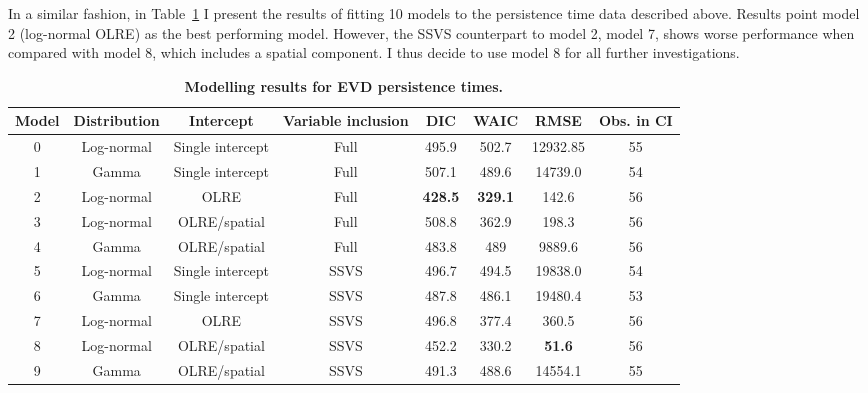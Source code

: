 In a similar fashion, in Table~\ref{tab:persistenceModels} I present the results of fitting 10 models to the persistence time data described above.
Results point model 2 (log-normal OLRE) as the best performing model.
However, the SSVS counterpart to model 2, model 7, shows worse performance when compared with model 8, which includes a spatial component.
I thus decide to use model 8 for all further investigations.

\begin{minipage}{\textwidth}    
\setcounter{mpfootnote}{\value{footnote}}
\renewcommand{\thempfootnote}{\arabic{mpfootnote}}
\fontsize{9}{10}\selectfont
{}
\begin{longtable}{cccccccc}
\caption{\textbf{Modelling results for EVD persistence times.}}
\label{tab:persistenceModels}\\
\toprule
Model & Distribution & Intercept& Variable inclusion & DIC  & WAIC   & RMSE\footnotemark[1] & Obs. in CI\footnotemark[2]\\
\toprule
0  & Log-normal & Single intercept & Full & 495.9 & 502.7 & 12932.85 & 55 \\
\hline
1   & Gamma & Single intercept & Full &  507.1 & 489.6 & 14739.0 & 54 \\
\hline
2 & Log-normal & OLRE & Full &  \textbf{428.5} & \textbf{329.1} & 142.6   & 56 \\
\hline
3 & Log-normal & OLRE/spatial\footnotemark[3] & Full & 508.8 & 362.9 & 198.3   & 56 \\
\hline
4 & Gamma & OLRE/spatial\footnotemark[4] & Full & 483.8 & 489 & 9889.6  & 56 \\
\hline
5 & Log-normal  & Single intercept & SSVS & 496.7 & 494.5 & 19838.0 & 54 \\
\hline
6 & Gamma & Single intercept & SSVS & 487.8 & 486.1 & 19480.4 & 53 \\
\hline
7 & Log-normal & OLRE & SSVS &  496.8 & 377.4 & 360.5 & 56 \\
\hline
8 & Log-normal & OLRE/spatial\footnotemark[3] & SSVS & 452.2 & 330.2 & \textbf{51.6}  & 56 \\
\hline
9 & Gamma & OLRE/spatial\footnotemark[4]& SSVS &  491.3 & 488.6 & 14554.1 & 55 \\
\bottomrule
\end{longtable}
\setcounter{footnote}{\value{mpfootnote}}
\end{minipage}

